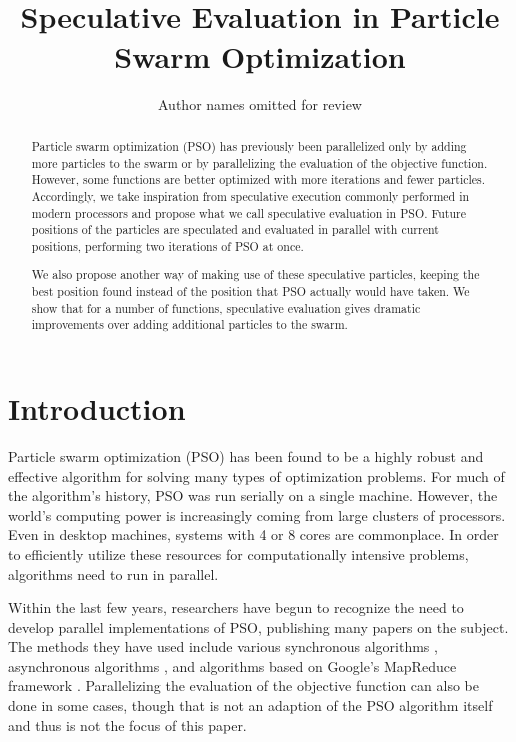 \documentclass[letterpaper]{sig-alt-release2}
\title{\ \\ \LARGE\bf Speculative Evaluation in Particle Swarm Optimization%
}
\date{}
\author{Author names omitted for review}
\begin{document}
\maketitle

\begin{abstract}

Particle swarm optimization (PSO) has previously been parallelized only by 
adding more particles to the swarm or by parallelizing the evaluation of the
objective function.  However, some functions are better optimized with more
iterations and fewer particles.  Accordingly, we take inspiration from 
speculative execution commonly performed in modern processors and propose what
we call speculative evaluation in PSO.  Future positions of the particles are
speculated and evaluated in parallel with current positions, performing two
iterations of PSO at once.

We also propose another way of making use of these speculative particles,
keeping the best position found instead of the position that PSO actually would
have taken.  We show that for a number of functions, speculative evaluation
gives dramatic improvements over adding additional particles to the swarm.

\end{abstract}




\section{Introduction}
\label{sec:intro}

Particle swarm optimization (PSO) has been found to be a highly robust and
effective algorithm for solving many types of optimization problems.  For much
of the algorithm's history, PSO was run serially on a single machine.  However,
the world's computing power is increasingly coming from large clusters of
processors.  Even in desktop machines, systems with 4 or 8 cores are
commonplace.  In order to efficiently utilize these resources for
computationally intensive problems, algorithms need to run in parallel.

Within the last few years, researchers have begun to recognize the need to
develop parallel implementations of PSO, publishing many papers on the subject.
The methods they have used include various synchronous algorithms
\cite{belal-ijicis04,chu-sci06,jin-aps05,parsopoulos-aia04,schutte-ijnme04},
asynchronous algorithms \cite{koh-ijnme06,mostaghim-report06,venter-wcsmo05},
and algorithms based on Google's MapReduce framework \cite{mcnabb-cec07}.
Parallelizing the evaluation of the objective function can also be done in some
cases, though that is not an adaption of the PSO algorithm itself and thus is
not the focus of this paper.
\end{document}
